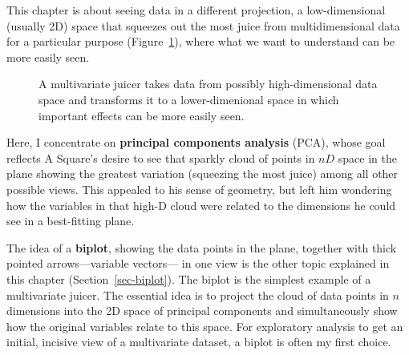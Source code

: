 \documentclass[
  letterpaper,
  10pt,
  krantz2]{krantz}
\begin{document}
This chapter is about seeing data in a different projection, a
low-dimensional (usually 2D) space that squeezes out the most juice from
multidimensional data for a particular purpose
(Figure~\ref{fig-MV-juicer}), where what we want to understand can be
more easily seen.

\begin{figure}


\caption{\label{fig-MV-juicer}A multivariate juicer takes data from
possibly high-dimensional data space and transforms it to a
lower-dimenional space in which important effects can be more easily
seen.}

\end{figure}%

Here, I concentrate on \textbf{principal components analysis} (PCA),
whose goal reflects A Square's desire to see that sparkly cloud of
points in \(nD\) space in the plane showing the greatest variation
(squeezing the most juice) among all other possible views. This appealed
to his sense of geometry, but left him wondering how the variables in
that high-D cloud were related to the dimensions he could see in a
best-fitting plane.

The idea of a \textbf{biplot}, showing the data points in the plane,
together with thick pointed arrows---variable vectors--- in one view is
the other topic explained in this chapter (Section~\ref{sec-biplot}).
The biplot is the simplest example of a multivariate juicer. The
essential idea is to project the cloud of data points in \(n\)
dimensions into the 2D space of principal components and simultaneously
show how the original variables relate to this space. For exploratory
analysis to get an initial, incisive view of a multivariate dataset, a
biplot is often my first choice.
\end{document}
